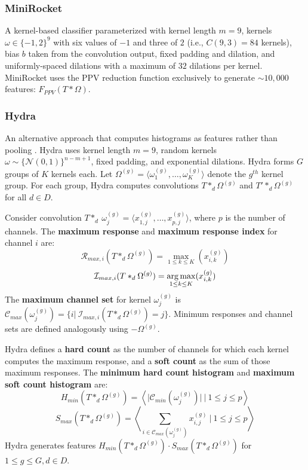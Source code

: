 \subsubsection{\textbf{MiniRocket}}
A kernel-based classifier parameterized with kernel length $m = 9$, kernels $\omega \in \{-1, 2\}^9$ with six values of $-1$ and three of $2$ (i.e., $C(9, 3) = 84$ kernels), bias $b$ taken from the convolution output, fixed padding and dilation, and uniformly-spaced dilations with a maximum of $32$ dilations per kernel. MiniRocket uses the PPV reduction function exclusively to generate $\mathtt{\sim}10{,}000$ features: $F_{PPV}(T * \Omega)$.

\subsubsection{\textbf{Hydra}}
An alternative approach that computes histograms as features rather than pooling \cite{Hydra}. Hydra uses kernel length $m = 9$, random kernels $\omega \sim \{\mathcal{N}(0,1)\}^{n-m+1}$, fixed padding, and exponential dilations. Hydra forms $G$ groups of $K$ kernels each. Let $\Omega^{(g)} = \langle \omega_1^{(g)}, \ldots, \omega_K^{(g)} \rangle$ denote the $g^{th}$ kernel group. For each group, Hydra computes convolutions $T *_d \Omega^{(g)}$ and $T' *_d \Omega^{(g)}$ for all $d \in D$.

Consider convolution $T *_d\ \omega_j^{(g)} = \langle x_{1, j}^{(g)}, \ldots, x_{p, j}^{(g)} \rangle$, where $p$ is the number of channels. The \textbf{maximum response} and \textbf{maximum response index} for channel $i$ are:
\begin{equation}
    \mathcal{R}_{max,i}(T *_d \Omega^{(g)}) = \max\limits_{1 \leq k \leq K}(x_{i,k}^{(g)})
    \label{eq:Rmax}
\end{equation}
\begin{equation}
    \mathcal{I}_{max,i}(T *_d \Omega^{(g)}) = \operatorname*{arg\,max}\limits_{1 \leq k \leq K}(x_{i,k}^{(g)})
    \label{eq:Imax}
\end{equation}
The \textbf{maximum channel set} for kernel $\omega_j^{(g)}$ is $\mathcal{C}_{max}(\omega_j^{(g)}) = \{i|\ \mathcal{I}_{max,i}(T *_d \Omega^{(g)}) = j\}$.
Minimum responses and channel sets are defined analogously using $-\Omega^{(g)}$.

Hydra defines a \textbf{hard count} as the number of channels for which each kernel computes the maximum response, and a \textbf{soft count} as the sum of those maximum responses. The \textbf{minimum hard count histogram} and \textbf{maximum soft count histogram} are:
\begin{equation}
    H_{min}(T *_d \Omega^{(g)}) = \left\langle \biggl|\mathcal{C}_{min}(\omega_j^{(g)})\biggr|\ |\ 1 \leq j \leq p \right\rangle
    \label{eq:Hmin}
\end{equation}
\begin{equation}
    S_{max}(T *_d \Omega^{(g)}) = \left\langle \sum_{i\in \mathcal{C}_{max}(\omega_j^{(g)})}x_{i,j}^{(g)}\ |\ 1 \leq j \leq p \right\rangle
    \label{eq:Smax}
\end{equation}
Hydra generates features $H_{min}(T *_d \Omega^{(g)}) \cdot S_{max}(T *_d \Omega^{(g)})$ for $1 \leq g \leq G, d \in D$.

